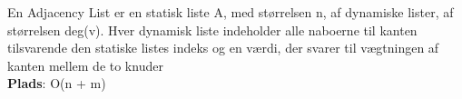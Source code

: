 En Adjacency List er en statisk liste A, med størrelsen n, af dynamiske lister, af størrelsen deg(v). Hver dynamisk liste indeholder alle naboerne til kanten tilsvarende den statiske listes indeks og en værdi, der svarer til vægtningen af kanten mellem de to knuder\\
\textbf{Plads}: O(n + m)
